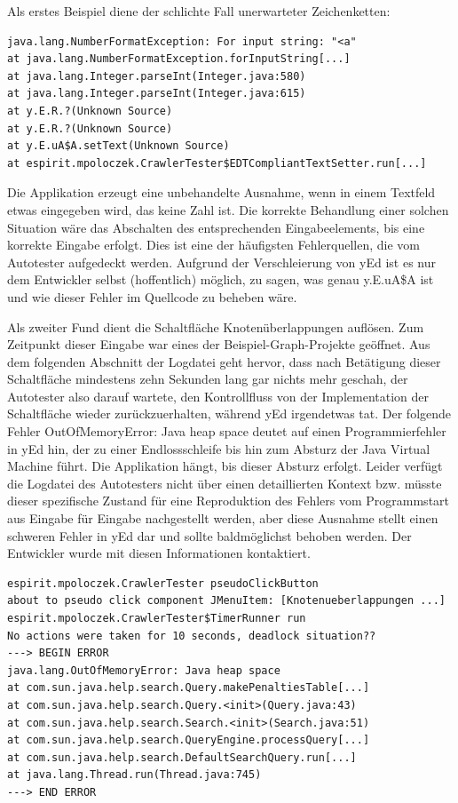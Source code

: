 Als erstes Beispiel diene der schlichte Fall unerwarteter Zeichenketten:

\begin{lstlisting}[float=!ht,label=fmjson,caption={Ausnahme bei Eingabe einer Nicht-Zahl}]
java.lang.NumberFormatException: For input string: "<a"
at java.lang.NumberFormatException.forInputString[...]
at java.lang.Integer.parseInt(Integer.java:580)
at java.lang.Integer.parseInt(Integer.java:615)
at y.E.R.?(Unknown Source)
at y.E.R.?(Unknown Source)
at y.E.uA$A.setText(Unknown Source)
at espirit.mpoloczek.CrawlerTester$EDTCompliantTextSetter.run[...]
\end{lstlisting}

Die Applikation erzeugt eine unbehandelte Ausnahme, wenn in einem
Textfeld etwas eingegeben wird, das keine Zahl ist. Die korrekte Behandlung
einer solchen Situation wäre das Abschalten des entsprechenden Eingabeelements,
bis eine korrekte Eingabe erfolgt. Dies ist eine der häufigsten Fehlerquellen,
die vom Autotester aufgedeckt werden. Aufgrund der Verschleierung von
yEd ist es nur dem Entwickler selbst (hoffentlich) möglich, zu sagen,
was genau \glqq{}y.E.uA\$A\grqq{} ist und wie dieser Fehler im Quellcode
zu beheben wäre.

Als zweiter Fund dient die Schaltfläche \glqq{}Knotenüberlappungen auflösen\grqq{}.
Zum Zeitpunkt dieser Eingabe war eines der Beispiel-Graph-Projekte geöffnet.
Aus dem folgenden Abschnitt der Logdatei geht hervor, dass nach Betätigung
dieser Schaltfläche mindestens zehn Sekunden lang gar nichts mehr geschah,
der Autotester also darauf wartete, den Kontrollfluss von der Implementation der
Schaltfläche wieder zurückzuerhalten, während yEd irgendetwas tat. Der
folgende Fehler \glqq{}OutOfMemoryError: Java heap space\grqq{}
deutet auf einen Programmierfehler in yEd hin, der zu einer Endlossschleife
bis hin zum Absturz der Java Virtual Machine führt. Die Applikation \glqq{}hängt\grqq{}, bis
dieser Absturz erfolgt. Leider verfügt die Logdatei des Autotesters nicht über einen
detaillierten Kontext bzw. müsste dieser spezifische Zustand für eine
Reproduktion des Fehlers vom Programmstart aus Eingabe für Eingabe nachgestellt werden, 
aber diese Ausnahme stellt einen schweren Fehler in yEd
dar und sollte baldmöglichst behoben werden. Der Entwickler wurde
mit diesen Informationen kontaktiert.

\begin{lstlisting}[float=!ht,label=fmjson,caption={Ausnahme yEd durch Schaltfläche \glqq{}Knotenüberlappungen auflösen\grqq{}}]
espirit.mpoloczek.CrawlerTester pseudoClickButton
about to pseudo click component JMenuItem: [Knotenueberlappungen ...]
espirit.mpoloczek.CrawlerTester$TimerRunner run
No actions were taken for 10 seconds, deadlock situation??
---> BEGIN ERROR
java.lang.OutOfMemoryError: Java heap space
at com.sun.java.help.search.Query.makePenaltiesTable[...]
at com.sun.java.help.search.Query.<init>(Query.java:43)
at com.sun.java.help.search.Search.<init>(Search.java:51)
at com.sun.java.help.search.QueryEngine.processQuery[...]
at com.sun.java.help.search.DefaultSearchQuery.run[...]
at java.lang.Thread.run(Thread.java:745)
---> END ERROR
\end{lstlisting}


